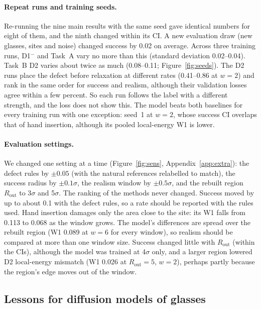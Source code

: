 \documentclass[10pt]{article}
\newcommand{\Dm}{D1$^{-}$}
\begin{document}
\paragraph{Repeat runs and training seeds.} Re-running the nine main results with the same seed gave identical numbers for eight of them, and the ninth changed within its CI. A new evaluation draw (new glasses, sites and noise) changed success by 0.02 on average. Across three training runs, \Dm{} and Task~A vary no more than this (standard deviation 0.02--0.04). Task~B D2 varies about twice as much (0.08--0.11; Figure~\ref{fig:seeds}). The D2 runs place the defect before relaxation at different rates (0.41--0.86 at $w=2$) and rank in the same order for success and realism, although their validation losses agree within a few percent. So each run follows the label with a different strength, and the loss does not show this. The model beats both baselines for every training run with one exception: seed~1 at $w=2$, whose success CI overlaps that of hand insertion, although its pooled local-energy W1 is lower.

\paragraph{Evaluation settings.} We changed one setting at a time (Figure~\ref{fig:sens}, Appendix~\ref{app:extra}): the defect rules by $\pm0.05$ (with the natural references relabelled to match), the success radius by $\pm0.1\sigma$, the realism window by $\pm0.5\sigma$, and the rebuilt region $R_\text{out}$ to 3$\sigma$ and 5$\sigma$. The ranking of the methods never changed. Success moved by up to about 0.1 with the defect rules, so a rate should be reported with the rules used. Hand insertion damages only the area close to the site: its W1 falls from 0.113 to 0.068 as the window grows. The model's differences are spread over the rebuilt region (W1 0.089 at $w=6$ for every window), so realism should be compared at more than one window size. Success changed little with $R_\text{out}$ (within the CIs), although the model was trained at 4$\sigma$ only, and a larger region lowered D2 local-energy mismatch (W1 0.026 at $R_\text{out}=5$, $w=2$), perhaps partly because the region's edge moves out of the window.

\subsection{Lessons for diffusion models of glasses}
\label{sec:lessons}
\end{document}
